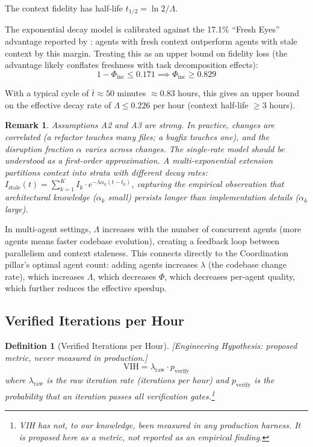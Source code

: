 \documentclass[11pt, a4paper]{googledeepmind}
\newtheorem{definition}{Definition}[section]
\newtheorem*{remark}{Remark}
\begin{document}
The context fidelity has half-life $t_{1/2} = \ln 2 / \Lambda$.

The exponential decay model is calibrated against the 17.1\% ``Fresh Eyes'' advantage reported by \citet{suzgun2024metaprompting}: agents with fresh context outperform agents with stale context by this margin. Treating this as an upper bound on fidelity loss (the advantage likely conflates freshness with task decomposition effects):
\begin{equation}
    1 - \Phi_{\mathrm{inc}} \leq 0.171 \implies \Phi_{\mathrm{inc}} \geq 0.829
\end{equation}

With a typical cycle of $\bar{t} \approx 50$ minutes $\approx 0.83$ hours, this gives an upper bound on the effective decay rate of $\Lambda \leq 0.226$ per hour (context half-life $\geq 3$ hours).

\begin{remark}
Assumptions A2 and A3 are strong. In practice, changes are correlated (a refactor touches many files; a bugfix touches one), and the disruption fraction $\alpha$ varies across changes. The single-rate model should be understood as a first-order approximation. A multi-exponential extension partitions context into strata with different decay rates: $I_{\mathrm{stale}}(t) = \sum_{k=1}^K I_k \cdot e^{-\lambda\alpha_k(t - t_0)}$, capturing the empirical observation that architectural knowledge ($\alpha_k$ small) persists longer than implementation details ($\alpha_k$ large).
\end{remark}

In multi-agent settings, $\Lambda$ increases with the number of concurrent agents (more agents means faster codebase evolution), creating a feedback loop between parallelism and context staleness. This connects directly to the Coordination pillar's optimal agent count: adding agents increases $\lambda$ (the codebase change rate), which increases $\Lambda$, which decreases $\Phi$, which decreases per-agent quality, which further reduces the effective speedup.

\subsection{Verified Iterations per Hour}

\begin{definition}[Verified Iterations per Hour]
\emph{[Engineering Hypothesis: proposed metric, never measured in production.]}
\label{def:vih}
\begin{equation}
    \text{VIH} = \lambda_{\text{raw}} \cdot p_{\text{verify}}
\end{equation}
where $\lambda_{\text{raw}}$ is the raw iteration rate (iterations per hour) and $p_{\text{verify}}$ is the probability that an iteration passes all verification gates.\footnote{VIH has not, to our knowledge, been measured in any production harness. It is proposed here as a metric, not reported as an empirical finding.}
\end{definition}
\end{document}
